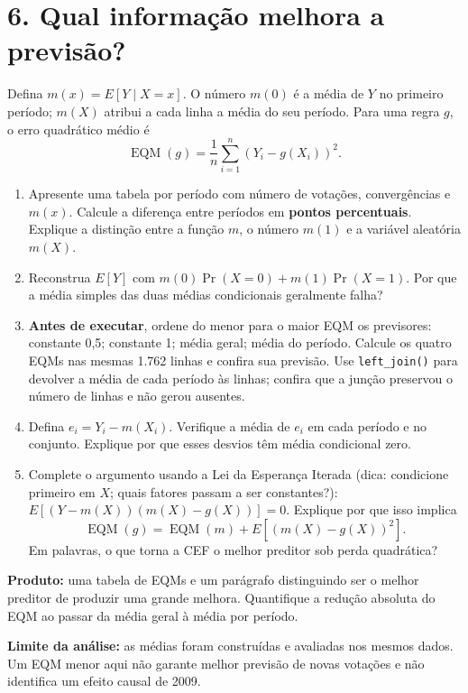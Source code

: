 \documentclass[
  brazilian,
  11pt,
  a4paper]{article}
\providecommand{\tightlist}{%
  \setlength{\itemsep}{0pt}\setlength{\parskip}{0pt}}
\begin{document}
\newpage

\section{6. Qual informação melhora a
previsão?}\label{qual-informauxe7uxe3o-melhora-a-previsuxe3o}

Defina \(m(x)=E[Y\mid X=x]\). O número \(m(0)\) é a média de \(Y\) no
primeiro período; \(m(X)\) atribui a cada linha a média do seu período.
Para uma regra \(g\), o erro quadrático médio é \[
\operatorname{EQM}(g)=\frac{1}{n}\sum_{i=1}^{n}(Y_i-g(X_i))^2.
\]

\begin{enumerate}
\def\labelenumi{\alph{enumi}.}
\tightlist
\item
  Apresente uma tabela por período com número de votações, convergências
  e \(m(x)\). Calcule a diferença entre períodos em \textbf{pontos
  percentuais}. Explique a distinção entre a função \(m\), o número
  \(m(1)\) e a variável aleatória \(m(X)\).
\item
  Reconstrua \(E[Y]\) com \(m(0)\Pr(X=0)+m(1)\Pr(X=1)\). Por que a média
  simples das duas médias condicionais geralmente falha?
\item
  \textbf{Antes de executar}, ordene do menor para o maior EQM os
  previsores: constante 0,5; constante 1; média geral; média do período.
  Calcule os quatro EQMs nas mesmas 1.762 linhas e confira sua previsão.
  Use \texttt{left\_join()} para devolver a média de cada período às
  linhas; confira que a junção preservou o número de linhas e não gerou
  ausentes.
\item
  Defina \(e_i=Y_i-m(X_i)\). Verifique a média de \(e_i\) em cada
  período e no conjunto. Explique por que esses desvios têm média
  condicional zero.
\item
  Complete o argumento usando a Lei da Esperança Iterada (dica:
  condicione primeiro em \(X\); quais fatores passam a ser constantes?):
  \(E[(Y-m(X))(m(X)-g(X))]=0\). Explique por que isso implica \[
  \operatorname{EQM}(g)=\operatorname{EQM}(m)
  +E[(m(X)-g(X))^2].
  \] Em palavras, o que torna a CEF o melhor preditor sob perda
  quadrática?
\end{enumerate}

\textbf{Produto:} uma tabela de EQMs e um parágrafo distinguindo ser o
melhor preditor de produzir uma grande melhora. Quantifique a redução
absoluta do EQM ao passar da média geral à média por período.

\textbf{Limite da análise:} as médias foram construídas e avaliadas nos
mesmos dados. Um EQM menor aqui não garante melhor previsão de novas
votações e não identifica um efeito causal de 2009.
\end{document}
